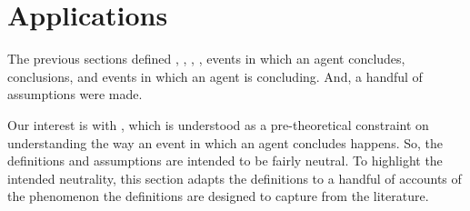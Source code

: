 





\section{Applications}
\label{sec:compatibility}


\begin{note}
  The previous sections defined , , , , events in which an agent concludes, conclusions, and events in which an agent is concluding.
  And, a handful of assumptions were made.

  Our interest is with \issueInclusion{}, which is understood as a pre-theoretical constraint on understanding the way an event in which an agent concludes happens.
  So, the definitions and assumptions are intended to be fairly neutral.
  To highlight the intended neutrality, this section adapts the definitions to a handful of accounts of the phenomenon the definitions are designed to capture from the literature.
\end{note}


